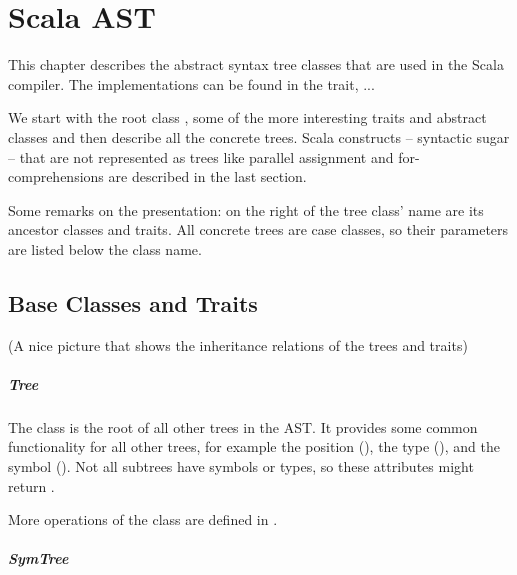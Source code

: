 \chapter{Scala AST} \label{chapter:scala-ast}

This chapter describes the abstract syntax tree classes that are used in the Scala compiler. The implementations can be found in the  trait, ...

We start with the root class , some of the more interesting traits and abstract classes and then describe all the concrete trees. Scala constructs -- syntactic sugar -- that are not represented as trees like parallel assignment and for-comprehensions are described in the last section.

Some remarks on the presentation: on the right of the tree class' name are its ancestor classes and traits. All concrete trees are case classes, so their parameters are listed below the class name.

\newcommand{\member} [2] {\hfill \begin{footnotesize}\src{#1} \newline \vspace{5pt} \src{#2}\end{footnotesize}\vspace{5pt}}

\section{Base Classes and Traits}

(A nice picture that shows the inheritance relations of the trees and traits)

\paragraph{Tree} \hfill \newline

\noindent The  class is the root of all other trees in the AST. It provides some common functionality for all other trees, for example the position (), the type (), and the symbol (). Not all subtrees have symbols or types, so these attributes might return .

More operations of the  class are defined in .

\paragraph{SymTree} \hfill \begin{footnotesize}\end{footnotesize} \newline


